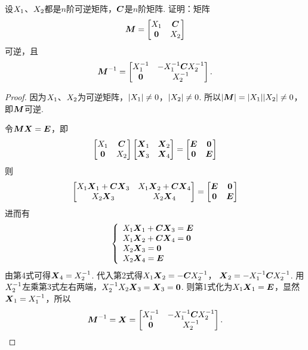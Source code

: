 \begin{example}
设\(\A\)、\(\B\)都是\(n\)阶可逆矩阵，\(\C\)是\(n\)阶矩阵.
证明：矩阵\[
	\vb{M} = \begin{bmatrix}
		\A & \C \\
		\z & \B
	\end{bmatrix}
\]可逆，且\[
	\vb{M}^{-1} = \begin{bmatrix}
		\A^{-1} & -\A^{-1} \C \B^{-1} \\
		\z & \B^{-1}
	\end{bmatrix}.
\]
\begin{proof}
因为\(\A\)、\(\B\)为可逆矩阵，\(\abs{\A} \neq 0\)，\(\abs{\B} \neq 0\).
所以\(\abs{\vb{M}}=\abs{\A}\abs{\B} \neq 0\)，即\(\vb{M}\)可逆.

令\(\vb{M}\x=\E\)，即\[
	\begin{bmatrix}
		\A & \C \\
		\z & \B
	\end{bmatrix}
	\begin{bmatrix}
		\x_1 & \x_2 \\
		\x_3 & \x_4
	\end{bmatrix}
	= \begin{bmatrix}
		\E & \z \\
		\z & \E
	\end{bmatrix}
\]则\[
	\begin{bmatrix}
		\A\x_1+\C\x_3 & \A\x_2+\C\x_4 \\
		\B\x_3 & \B\x_4
	\end{bmatrix}
	= \begin{bmatrix}
		\E & \z \\
		\z & \E
	\end{bmatrix}
\]
进而有\[
	\left\{ \begin{array}{l}
		\A\x_1+\C\x_3 = \E \\
		\A\x_2+\C\x_4 = \z \\
		\B\x_3 = \z \\
		\B\x_4 = \E
	\end{array} \right.
\]
由第4式可得\(\x_4 = \B^{-1}\).
代入第2式得\(\A\x_2=-\C\B^{-1}\)，
\(\x_2=-\A^{-1}\C\B^{-1}\).
用\(\B^{-1}\)左乘第3式左右两端，\(\B^{-1}\B\x_3=\x_3=\z\).
则第1式化为\(\A\x_1=\E\)，显然\(\x_1=\A^{-1}\)，所以\[
	\vb{M}^{-1} = \x = \begin{bmatrix}
		\A^{-1} & -\A^{-1}\C\B^{-1} \\
		\z & \B^{-1}
	\end{bmatrix}.
	\qedhere
\]
\end{proof}
\end{example}

